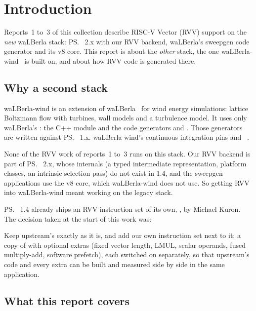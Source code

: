\chapter{Introduction}\label{r04:ch:intro}

Reports~1 to~3 of this collection describe RISC-V Vector (RVV) support on the
\emph{new} waLBerla stack: \ps{}~2.x with our RVV backend, waLBerla's sweepgen code
generator and its v8 core. This report is about the \emph{other} stack, the one
waLBerla-wind~\cite{walberla-wind} is built on, and about how RVV code is generated
there.

\section{Why a second stack}

waLBerla-wind is an extension of waLBerla~\cite{walberla} for wind energy simulations:
lattice Boltzmann flow with turbines, wall models and a turbulence model. It uses only
waLBerla's : the C++ module  and the code
generators  and . Those
generators are written against \ps{}~1.x. waLBerla-wind's continuous integration pins
 and ~\cite{pystencils14,lbmpy}.

None of the RVV work of reports~1 to~3 runs on this stack. Our RVV backend is part of
\ps{}~2.x, whose internals (a typed intermediate representation, platform classes, an
intrinsic selection pass) do not exist in 1.4, and the sweepgen applications use the v8
core, which waLBerla-wind does not use. So getting RVV into waLBerla-wind meant working
on the legacy stack.

\ps{}~1.4 already ships an RVV instruction set of its own, , by Michael Kuron.
The decision taken at the start of this work was:
\begin{keyidea}
  Keep upstream's  exactly as it is, and add our own instruction set
   next to it: a copy of  with optional extras (fixed vector
  length, LMUL, scalar operands, fused multiply-add, software prefetch), each switched
  on separately, so that upstream's code and every extra can be built and measured
  side by side in the same application.
\end{keyidea}

\section{What this report covers}

